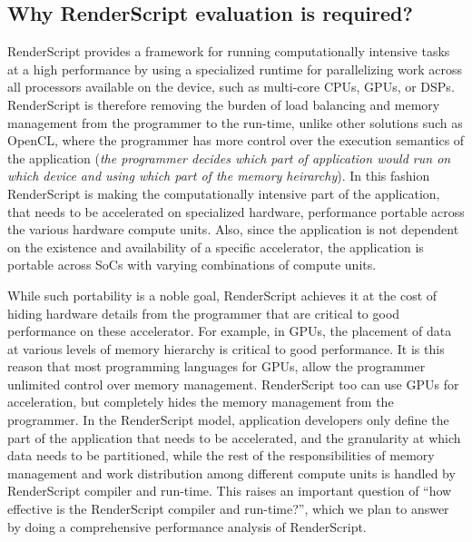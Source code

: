 \subsection{Why RenderScript evaluation is required?}
RenderScript provides a framework
for running computationally intensive tasks at a high performance by using a
specialized runtime for 
parallelizing work across all processors available on the device, such as
multi-core CPUs, GPUs, or DSPs. RenderScript is therefore removing the
burden of load balancing and memory management from the programmer to the run-time, unlike other
solutions such as OpenCL, where the programmer has more control over the
execution semantics of the application ({\em the programmer decides which part
of application would run on which device and using which part of the memory heirarchy}).
In this fashion RenderScript is
making the computationally intensive part of the application, that needs to be
accelerated on specialized hardware, performance portable across the various hardware compute
units. Also, since the application is not dependent on the existence and
availability of a specific accelerator, the application is portable across SoCs
with varying combinations of compute units.

While such portability is a noble goal, RenderScript achieves it at the cost of
hiding hardware details from the programmer that are critical to good
performance on these accelerator. For example, in GPUs, the placement of data at
various levels of memory hierarchy is critical to good performance.
It is this reason that most programming languages for GPUs, allow the programmer
unlimited control over memory management. RenderScript too can use GPUs for acceleration, but
completely hides the memory management from the programmer. In the RenderScript
model, application developers only define the part of the application that needs
to be accelerated, and the granularity at which data needs to be partitioned,
while the rest of the responsibilities of memory management and work distribution
among different compute units is handled by RenderScript compiler and run-time.
This raises an important
question of ``how effective is the RenderScript compiler and run-time?'', which
we plan to answer by doing a comprehensive performance analysis of RenderScript.






